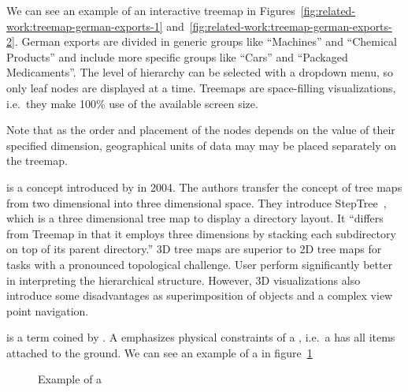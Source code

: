 We can see an example of an interactive treemap in Figures~\ref{fig:related-work:treemap-german-exports-1} and~\ref{fig:related-work:treemap-german-exports-2}.
German exports are divided in generic groups like ``Machines'' and ``Chemical Products'' and include more specific groups like ``Cars'' and ``Packaged Medicaments''.
The level of hierarchy can be selected with a dropdown menu, so only leaf nodes are displayed at a time.
Treemaps are space-filling visualizations, i.e.\ they make 100\% use of the available screen size.

Note that as the order and placement of the nodes depends on the value of their specified dimension, geographical units of data may may be placed separately on the treemap.

\textbf{\threedTmaps{}} is a concept introduced by \textcite{Bladh2004} in 2004.
The authors transfer the concept of tree maps from two dimensional into three dimensional space.
They introduce StepTree~\cite{Bladh2004}, which is a three dimensional tree map to display a directory layout.
It ``differs from Treemap in that it employs three dimensions by stacking each subdirectory on top of its parent directory.''
3D tree maps are superior to 2D tree maps for tasks with a pronounced topological challenge.
User perform significantly better in interpreting the hierarchical structure.
However, 3D visualizations also introduce some disadvantages as superimposition of objects and a complex view point navigation.

\textbf{\tmap{}} is a term coined by \textcite{Limberger2016}.
A \tmap{} emphasizes physical constraints of a \threedTmap{}, i.e.\ a \tmap{} has all items attached to the ground.
We can see an example of a \tmap{} in figure~\ref{fig:research:ua_treemap}

\begin{figure}[ht]
  \centering
  \caption{Example of a \tmap{}}\label{fig:research:ua_treemap}
\end{figure}

